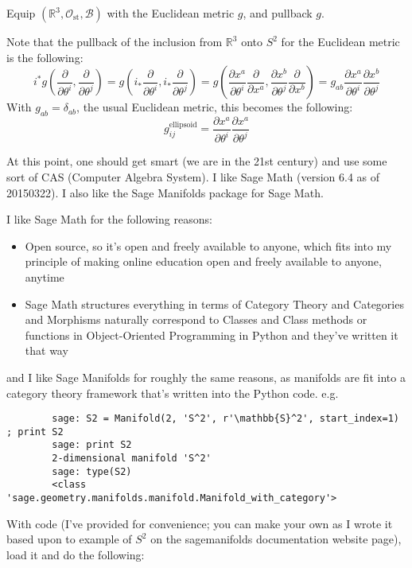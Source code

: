 \documentclass[10pt]{amsart}
\newcommand{\questionhead}[1]
  {\bigskip\bigskip
   \noindent{\small\bf Question #1.}
   \bigskip}
\begin{document}
\begin{multicols*}{2}
	\questionhead{}
	
	Equip $(\mathbb{R}^3, \mathcal{O}_{\text{st}}, \mathcal{B})$ with the Euclidean metric $g$, and pullback $g$.  
	
	Note that the pullback of the inclusion from $\mathbb{R}^3$ onto $S^2$ for the Euclidean metric is the following:
	\[
	i^* g\left( \frac{ \partial }{ \partial \theta^i }, \frac{ \partial }{ \partial \theta^j} \right) = g\left( i_*\frac{ \partial }{ \partial \theta^i }, i_*\frac{ \partial }{ \partial \theta^j} \right) = g\left( \frac{ \partial x^a}{ \partial \theta^i} \frac{ \partial }{ \partial x^a} , \frac{ \partial x^b}{ \partial \theta^j} \frac{ \partial }{ \partial x^b } \right) = g_{ab} \frac{ \partial x^a}{ \partial \theta^i} \frac{ \partial x^b}{ \partial \theta^j} 
	\]
	With $g_{ab}=\delta_{ab}$, the usual Euclidean metric, this becomes the following:
	\[
	g^{\text{ellipsoid}}_{ij} = \frac{ \partial x^a}{ \partial \theta^i} \frac{ \partial x^a}{ \partial \theta^j} 
	\]
	
	At this point, one should get smart (we are in the 21st century) and use some sort of CAS (Computer Algebra System). I like Sage Math (version 6.4 as of 20150322).  I also like the Sage Manifolds package for Sage Math.  
	
	I like Sage Math for the following reasons:
	\begin{itemize}
		\item Open source, so it’s open and freely available to anyone, which fits into my principle of making online education open and freely available to anyone, anytime
		\item Sage Math structures everything in terms of Category Theory and Categories and Morphisms naturally correspond to Classes and Class methods or functions in Object-Oriented Programming in Python and they’ve written it that way
	\end{itemize}
	and I like Sage Manifolds for roughly the same reasons, as manifolds are fit into a category theory framework that’s written into the Python code.  e.g.
	
	{\small \begin{verbatim}
		sage: S2 = Manifold(2, 'S^2', r'\mathbb{S}^2', start_index=1) ; print S2
		sage: print S2
		2-dimensional manifold 'S^2'
		sage: type(S2)
		<class 'sage.geometry.manifolds.manifold.Manifold_with_category'>
		\end{verbatim}}
	
	With code (I’ve provided for convenience; you can make your own as I wrote it based upon to example of $S^2$ on the sagemanifolds documentation website page), load it and do the following:
	

\end{multicols*}
\end{document}
